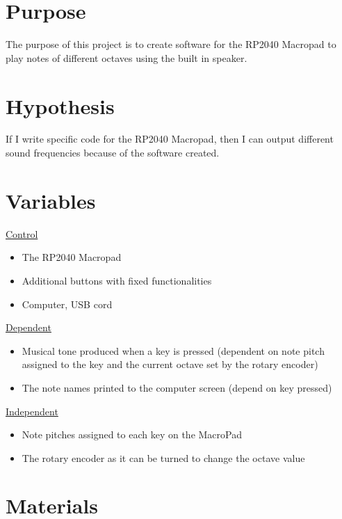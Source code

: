 \documentclass{article}
\begin{document}
\section{Purpose}

The purpose of this project is to create software for the RP2040 Macropad to play notes of different octaves using the built in speaker. 

\section{Hypothesis}

If I write specific code for the RP2040 Macropad, then I can output different sound frequencies because of the software created.

\newpage
\section{Variables}

\underline{Control}
\begin{itemize}
    \item The RP2040 Macropad
    \item Additional buttons with fixed functionalities
    \item Computer, USB cord
\end{itemize}
\underline{Dependent}
\begin{itemize}
    \item Musical tone produced when a key is pressed (dependent on note pitch assigned to the key and the current octave set by the rotary encoder)
    \item The note names printed to the computer screen (depend on key pressed)
\end{itemize}
\underline{Independent}
\begin{itemize}
    \item Note pitches assigned to each key on the MacroPad
    \item The rotary encoder as it can be turned to change the octave value
\end{itemize}

\section{Materials}
\end{document}
